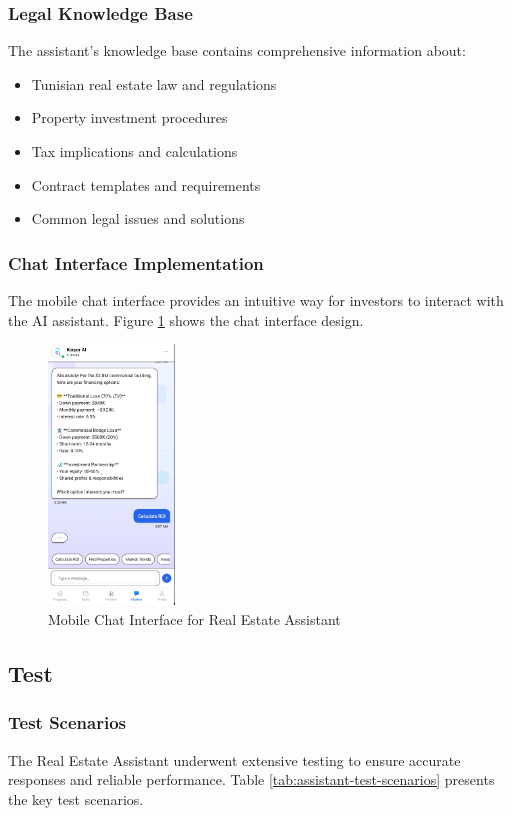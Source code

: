 \subsubsection{Legal Knowledge Base}
The assistant's knowledge base contains comprehensive information about:
\begin{itemize}
    \item Tunisian real estate law and regulations
    \item Property investment procedures
    \item Tax implications and calculations
    \item Contract templates and requirements
    \item Common legal issues and solutions
\end{itemize}

\subsubsection{Chat Interface Implementation}
The mobile chat interface provides an intuitive way for investors to interact with the AI assistant. Figure \ref{fig:assistant-mobile-chat} shows the chat interface design.

\begin{figure}[htbp]
    \centering
    \includegraphics[width=0.3\textwidth]{images/assistant_mobile_chat.png}
    \caption{Mobile Chat Interface for Real Estate Assistant}
    \label{fig:assistant-mobile-chat}
\end{figure}


\subsection{Test}
\subsubsection{Test Scenarios}
The Real Estate Assistant underwent extensive testing to ensure accurate responses and reliable performance. Table \ref{tab:assistant-test-scenarios} presents the key test scenarios.

